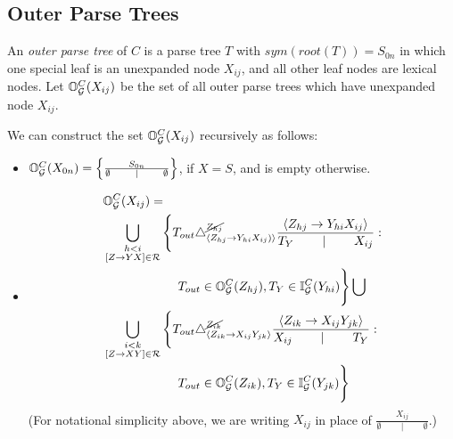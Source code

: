 \subsection{Outer Parse Trees}

\begin{defn}
  An \emph{outer parse tree} of $C$ is a parse tree $T$ with
  $sym(root(T)) = S_{0n}$ in which one special leaf is an unexpanded node
  $X_{ij}$, and all other leaf nodes are lexical nodes. Let
  $\mathbb{O}_{{\mathcal G}}^C(X_{ij})$ be the set of all outer parse trees which
  have unexpanded node $X_{ij}$.
\end{defn}

\begin{prop}
\label{prop-outer-set}
  We can construct the set $\mathbb{O}_{{\mathcal G}}^C(X_{ij})$ recursively as
  follows:
\begin{itemize}
\item $\mathbb{O}_{{\mathcal G}}^C(X_{0n}) = \left\{ \frac{S_{0n}}{\emptyset \qquad
      \mid \qquad \emptyset} \right\}$, if $X=S$, and is empty otherwise.
\item 
\begin{align*}
&\mathbb{O}_{{\mathcal G}}^C(X_{ij}) = \\
&\bigcup_{\substack{h < i \\ [Z \to YX]\in {\mathcal R}}}
\Bigg\{
T_{out} \triangle^{\cancel{Z_{hj}}}_{\langle Z_{hj} \to Y_{hi}
  X_{ij})\rangle} \frac{ \langle Z_{hj} \to Y_{hi}
  X_{ij} \rangle}{ T_Y \qquad \mid \qquad X_{ij}} : \\
&\qquad\qquad\qquad T_{out} \in \mathbb{O}_{{\mathcal G}}^C(Z_{hj}), T_Y \in \mathbb{I}_{{\mathcal G}}^C(Y_{hi}) 
\Bigg\} \bigcup\\
&\bigcup_{\substack{i < k \\ [Z \to
    XY]\in {\mathcal R}}}
\Bigg\{
T_{out} \triangle^{\cancel{Z_{ik}}}_{\langle Z_{ik} \to X_{ij} Y_{jk}
  \rangle} \frac{ \langle Z_{ik} \to X_{ij}
  Y_{jk} \rangle}{ X_{ij} \qquad \mid \qquad  T_Y } :\\
&\qquad\qquad\qquad T_{out} \in \mathbb{O}_{{\mathcal G}}^C(Z_{ik}),
 T_Y \in \mathbb{I}_{{\mathcal G}}^C(Y_{jk}) \Bigg\}\\
\end{align*}
(For notational simplicity above, we are writing $X_{ij}$ in
place of $\frac{X_{ij}}{\emptyset \qquad \mid \qquad
  \emptyset}$.)
\end{itemize}
\end{prop}

